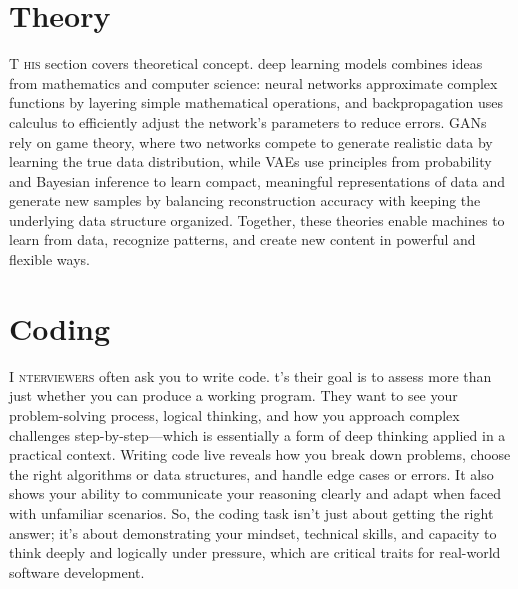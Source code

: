 \documentclass{book}
\begin{document}
\section{Theory}
\lettrine{T}{ his} section covers theoretical concept. deep learning models combines ideas from mathematics and computer science: neural networks approximate complex functions by layering simple mathematical operations, and backpropagation uses calculus to efficiently adjust the network’s parameters to reduce errors. GANs rely on game theory, where two networks compete to generate realistic data by learning the true data distribution, while VAEs use principles from probability and Bayesian inference to learn compact, meaningful representations of data and generate new samples by balancing reconstruction accuracy with keeping the underlying data structure organized. Together, these theories enable machines to learn from data, recognize patterns, and create new content in powerful and flexible ways.

\section{Coding}
\lettrine{I}{ nterviewers} often ask you to write code. t’s their goal is to assess more than just whether you
can produce a working program. They want to see your problem-solving process, logical thinking,
and how you approach complex challenges step-by-step—which is essentially a form of deep thinking
applied in a practical context. Writing code live reveals how you break down problems, choose the right
algorithms or data structures, and handle edge cases or errors. It also shows your ability to communicate
your reasoning clearly and adapt when faced with unfamiliar scenarios. So, the coding task isn’t just
about getting the right answer; it’s about demonstrating your mindset, technical skills, and capacity to
think deeply and logically under pressure, which are critical traits for real-world software development.
\end{document}
